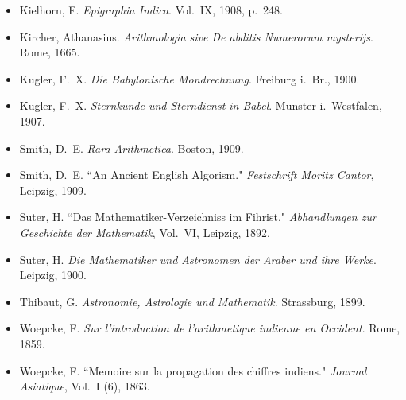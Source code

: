 \documentclass[11pt,a4paper]{article}
\begin{document}
\begin{footnotesize}
\begin{itemize}[leftmargin=2em,label={},itemsep=0.5ex]
\item Kielhorn, F. \textit{Epigraphia Indica}. Vol.~IX, 1908, p.~248.
\item Kircher, Athanasius. \textit{Arithmologia sive De abditis Numerorum mysterijs}. Rome, 1665.
\item Kugler, F.~X. \textit{Die Babylonische Mondrechnung}. Freiburg i.~Br., 1900.
\item Kugler, F.~X. \textit{Sternkunde und Sterndienst in Babel}. Munster i.~Westfalen, 1907.
\item Smith, D.~E. \textit{Rara Arithmetica}. Boston, 1909.
\item Smith, D.~E. ``An Ancient English Algorism." \textit{Festschrift Moritz Cantor}, Leipzig, 1909.
\item Suter, H. ``Das Mathematiker-Verzeichniss im Fihrist." \textit{Abhandlungen zur Geschichte der Mathematik}, Vol.~VI, Leipzig, 1892.
\item Suter, H. \textit{Die Mathematiker und Astronomen der Araber und ihre Werke}. Leipzig, 1900.
\item Thibaut, G. \textit{Astronomie, Astrologie und Mathematik}. Strassburg, 1899.
\item Woepcke, F. \textit{Sur l'introduction de l'arithmetique indienne en Occident}. Rome, 1859.
\item Woepcke, F. ``Memoire sur la propagation des chiffres indiens." \textit{Journal Asiatique}, Vol.~I (6), 1863.
\end{itemize}
\end{footnotesize}
\end{document}
